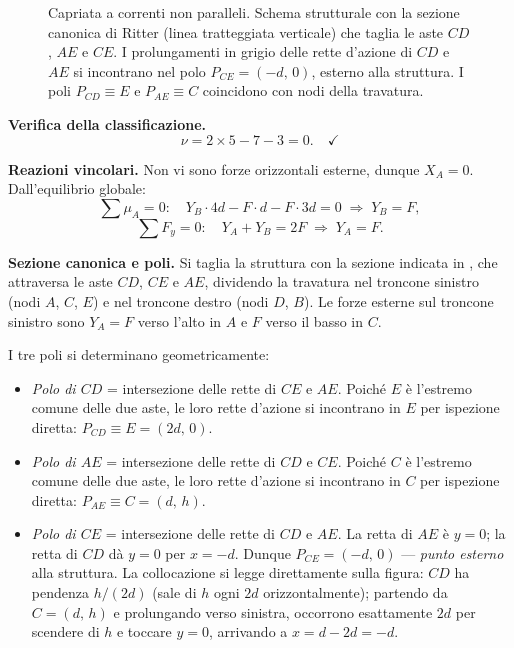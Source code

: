 \begin{esempio}
\begin{svolgimento}
\begin{figure}[htbp]
\begin{tikzpicture}
			\end{tikzpicture}
			\caption{Capriata a correnti non paralleli.
				Schema strutturale con la sezione canonica di
				Ritter (linea tratteggiata verticale) che taglia
				le aste $CD$, $AE$ e $CE$.
				I prolungamenti in grigio delle rette d'azione
				di $CD$ e $AE$ si incontrano nel polo
				$P_{CE} = (-d,\,0)$, esterno alla struttura.
				I poli $P_{CD} \equiv E$ e $P_{AE} \equiv C$
				coincidono con nodi della travatura.}
			\label{fig:ritter_non_paralleli}
		\end{figure}
		
		\noindent\textbf{Verifica della classificazione.}
		\[
		\nu = 2 \times 5 - 7 - 3 = 0. \quad\checkmark
		\]
		
		\noindent\textbf{Reazioni vincolari.}
		Non vi sono forze orizzontali esterne, dunque
		$X_A = 0$. Dall'equilibrio globale:
		\[
		\sum \mu_A = 0:\quad
		Y_B \cdot 4d - F \cdot d - F \cdot 3d = 0
		\;\Rightarrow\; Y_B = F,
		\]
		\[
		\sum F_y = 0:\quad
		Y_A + Y_B = 2F
		\;\Rightarrow\; Y_A = F.
		\]
		
		\noindent\textbf{Sezione canonica e poli.}
		Si taglia la struttura con la sezione indicata in
		, che attraversa
		le aste $CD$, $CE$ e $AE$, dividendo la travatura
		nel troncone sinistro (nodi $A$, $C$, $E$) e nel
		troncone destro (nodi $D$, $B$). Le forze esterne
		sul troncone sinistro sono $Y_A = F$ verso l'alto
		in $A$ e $F$ verso il basso in $C$.
		
		I tre poli si determinano geometricamente:
		
		\begin{itemize}[noitemsep]
			\item \emph{Polo di $CD$} = intersezione delle
			rette di $CE$ e $AE$. Poiché $E$ è l'estremo
			comune delle due aste, le loro rette d'azione
			si incontrano in $E$ per ispezione diretta:
			$P_{CD} \equiv E = (2d,\,0)$.
			
			\item \emph{Polo di $AE$} = intersezione delle
			rette di $CD$ e $CE$. Poiché $C$ è l'estremo
			comune delle due aste, le loro rette d'azione
			si incontrano in $C$ per ispezione diretta:
			$P_{AE} \equiv C = (d,\,h)$.
			
			\item \emph{Polo di $CE$} = intersezione
			delle rette di $CD$ e $AE$.
			La retta di $AE$ è $y = 0$; la retta di $CD$
			dà $y = 0$ per $x = -d$. Dunque
			$P_{CE} = (-d,\,0)$ --- \emph{punto esterno}
			alla struttura.
			La collocazione si legge direttamente sulla figura:
			$CD$ ha pendenza $h/(2d)$ (sale di $h$ ogni $2d$
			orizzontalmente); partendo da $C = (d,\,h)$ e
			prolungando verso sinistra, occorrono esattamente
			$2d$ per scendere di $h$ e toccare $y = 0$,
			arrivando a $x = d - 2d = -d$.
		\end{itemize}
		

\end{svolgimento}
\end{esempio}
